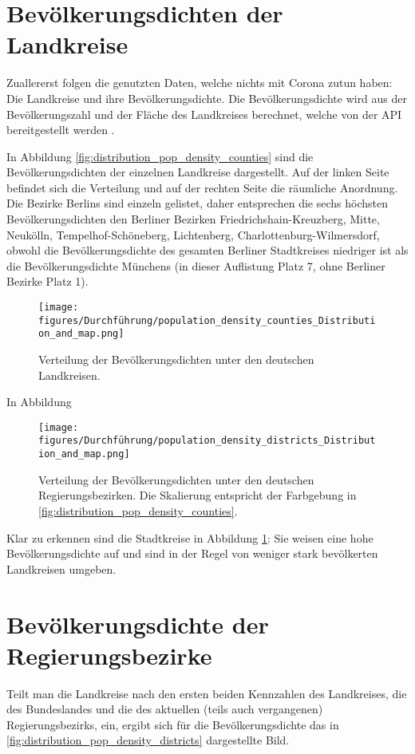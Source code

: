 \section{Bevölkerungsdichten der Landkreise}
Zuallererst folgen die genutzten Daten, welche nichts mit Corona zutun haben: Die Landkreise und ihre Bevölkerungsdichte. Die Bevölkerungsdichte wird aus der Bevölkerungszahl und der Fläche des Landkreises berechnet, welche von der API bereitgestellt werden .

In Abbildung \autoref{fig:distribution_pop_density_counties} sind die Bevölkerungsdichten der einzelnen Landkreise dargestellt. Auf der linken Seite befindet sich die Verteilung und auf der rechten Seite die räumliche Anordnung.
Die Bezirke Berlins sind einzeln gelistet, daher entsprechen die sechs höchsten Bevölkerungsdichten den Berliner Bezirken  Friedrichshain-Kreuzberg, Mitte, Neukölln, Tempelhof-Schöneberg, Lichtenberg, Charlottenburg-Wilmersdorf, obwohl die Bevölkerungsdichte des gesamten Berliner Stadtkreises niedriger ist als die Bevölkerungsdichte Münchens (in dieser Auflistung Platz 7, ohne Berliner Bezirke Platz 1).

\begin{figure}[H]
    \centering
    \texttt{[image: figures/Durchführung/population\_density\_counties\_Distribution\_and\_map.png]}
    \caption{Verteilung der Bevölkerungsdichten unter den deutschen Landkreisen.}
    \label{fig:distribution_pop_density_counties}
\end{figure}

In Abbildung 


\begin{figure}[H]
    \centering
    \texttt{[image: figures/Durchführung/population\_density\_districts\_Distribution\_and\_map.png]}
    \caption{Verteilung der Bevölkerungsdichten unter den deutschen Regierungsbezirken. Die Skalierung entspricht der Farbgebung in \autoref{fig:distribution_pop_density_counties}.}
    \label{fig:distribution_pop_density_districts}
\end{figure}

Klar zu erkennen sind die Stadtkreise in Abbildung \ref{fig:distribution_pop_density_counties}: Sie weisen eine hohe Bevölkerungsdichte auf und sind in der Regel von weniger stark bevölkerten Landkreisen umgeben.

\section{Bevölkerungsdichte der Regierungsbezirke}
Teilt man die Landkreise nach den ersten beiden Kennzahlen des Landkreises, die des Bundeslandes und die des aktuellen (teils auch vergangenen) Regierungsbezirks, ein, ergibt sich für die Bevölkerungsdichte das in \autoref{fig:distribution_pop_density_districts} dargestellte Bild.